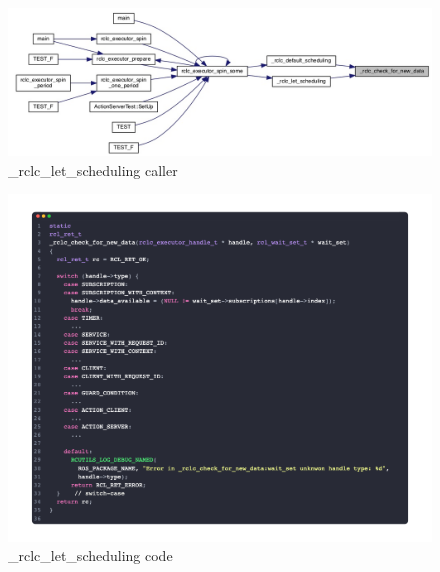 \subsubsection{}
\begin{figure}[htbp!]
    \centering
    \includegraphics[width=1\linewidth]{Img/graph/rclc/check_for_new_data_caller.jpg}
    \caption{\_rclc\_let\_scheduling caller}
    \vspace{-0.1in}
\end{figure}

\begin{figure}[htbp!]
    \centering
    \includegraphics[width=1\linewidth]{Img/code/rclc/_rclc_check_for_new_data.png}
    \caption{\_rclc\_let\_scheduling code}
    \vspace{-0.1in}
\end{figure}

